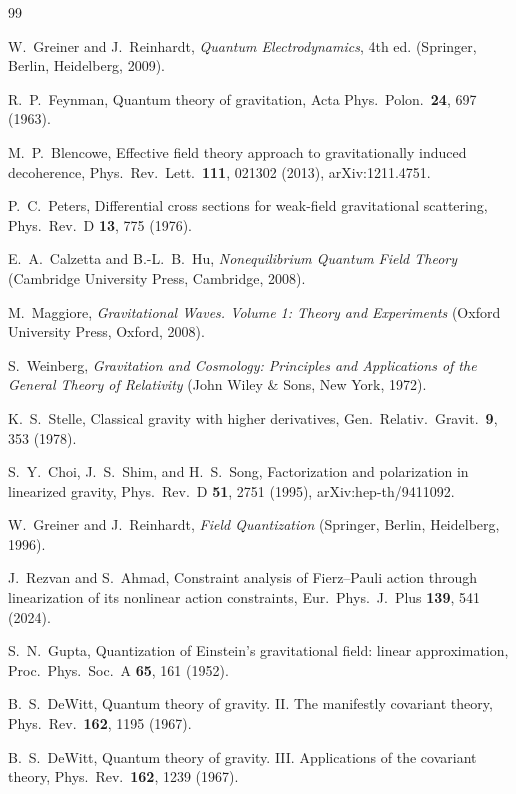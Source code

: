 \documentclass[12pt,a4paper,oneside]{article}
\numberwithin{equation}{section}   %
\begin{document}
\begin{thebibliography}{99}

W.~Greiner and J.~Reinhardt,
\textit{Quantum Electrodynamics}, 4th ed.
(Springer, Berlin, Heidelberg, 2009).

R.~P.~Feynman,
Quantum theory of gravitation,
Acta Phys.\ Polon.\ \textbf{24}, 697 (1963).

M.~P.~Blencowe,
Effective field theory approach to gravitationally induced decoherence,
Phys.\ Rev.\ Lett.\ \textbf{111}, 021302 (2013),
arXiv:1211.4751.

P.~C.~Peters,
Differential cross sections for weak-field gravitational scattering,
Phys.\ Rev.\ D \textbf{13}, 775 (1976).

E.~A.~Calzetta and B.-L.~B.~Hu,
\textit{Nonequilibrium Quantum Field Theory}
(Cambridge University Press, Cambridge, 2008).

M.~Maggiore,
\textit{Gravitational Waves. Volume 1: Theory and Experiments}
(Oxford University Press, Oxford, 2008).

S.~Weinberg,
\textit{Gravitation and Cosmology: Principles and Applications of the
General Theory of Relativity}
(John Wiley \& Sons, New York, 1972).

K.~S.~Stelle,
Classical gravity with higher derivatives,
Gen.\ Relativ.\ Gravit.\ \textbf{9}, 353 (1978).

S.~Y.~Choi, J.~S.~Shim, and H.~S.~Song,
Factorization and polarization in linearized gravity,
Phys.\ Rev.\ D \textbf{51}, 2751 (1995),
arXiv:hep-th/9411092.

W.~Greiner and J.~Reinhardt,
\textit{Field Quantization}
(Springer, Berlin, Heidelberg, 1996).

J.~Rezvan and S.~Ahmad,
Constraint analysis of Fierz--Pauli action through linearization of its
nonlinear action constraints,
Eur.\ Phys.\ J.\ Plus \textbf{139}, 541 (2024).

S.~N.~Gupta,
Quantization of Einstein's gravitational field: linear approximation,
Proc.\ Phys.\ Soc.\ A \textbf{65}, 161 (1952).

B.~S.~DeWitt,
Quantum theory of gravity. II. The manifestly covariant theory,
Phys.\ Rev.\ \textbf{162}, 1195 (1967).

B.~S.~DeWitt,
Quantum theory of gravity. III. Applications of the covariant theory,
Phys.\ Rev.\ \textbf{162}, 1239 (1967).


\end{thebibliography}
\end{document}

